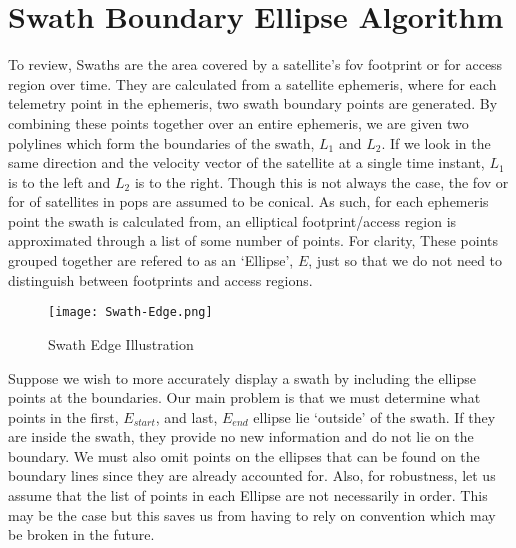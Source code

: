 
\section{Swath Boundary Ellipse Algorithm} \label{alg:ellipse}

To review, Swaths are the area covered by a satellite's \gls{fov} footprint or
\gls{for} access region over time. They are calculated from a satellite
ephemeris, where for each telemetry point in the ephemeris, two swath boundary
points are generated. By combining these points together over an entire
ephemeris, we are given two polylines which form the boundaries of the swath,
$L_1$ and $L_2$. If we look in the same direction and the velocity vector of
the satellite at a single time instant, $L_1$ is to the left and $L_2$ is to
the right. Though this is not always the case, the \gls{fov} or \gls{for} of
satellites in \gls{pops} are assumed to be conical. As such, for each ephemeris
point the swath is calculated from, an elliptical footprint/access region is
approximated through a list of some number of points. For clarity, These points
grouped together are refered to as an `Ellipse', $E$, just so that we do not
need to distinguish between footprints and access regions.  

\begin{figure}[h]
    \centering
    \texttt{[image: Swath-Edge.png]} 
    \caption{Swath Edge Illustration}
    \label{fig:swath-edge}
\end{figure}

Suppose we wish to more accurately display a swath by including the ellipse
points at the boundaries. Our main problem is that we must determine what
points in the first, $E_{start}$, and last, $E_{end}$ ellipse lie `outside' of the
swath.  If they are inside the swath, they provide no new information and do
not lie on the boundary.  We must also omit points on the ellipses that can be
found on the boundary lines since they are already accounted for. Also, for
robustness, let us assume that the list of points in each Ellipse are not
necessarily in order. This may be the case but this saves us from having to
rely on convention which may be broken in the future.


\newcommand{\Fs}{$\vec{\mathcal{F}}_s$} 

